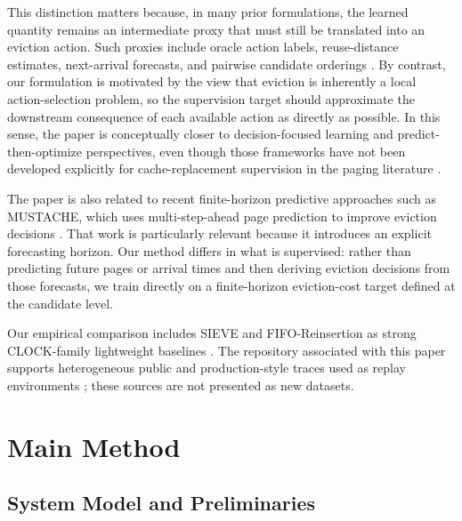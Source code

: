 \documentclass[preprint,12pt]{elsarticle}
\begin{document}
This distinction matters because, in many prior formulations, the learned quantity remains an intermediate proxy that must still be translated into an eviction action. Such proxies include oracle action labels, reuse-distance estimates, next-arrival forecasts, and pairwise candidate orderings \cite{liu2020parrot,shah2022mockingjay,hu2022raven,song2023halp}. By contrast, our formulation is motivated by the view that eviction is inherently a local action-selection problem, so the supervision target should approximate the downstream consequence of each available action as directly as possible. In this sense, the paper is conceptually closer to decision-focused learning and predict-then-optimize perspectives, even though those frameworks have not been developed explicitly for cache-replacement supervision in the paging literature \cite{elmachtoub2022smart_predict_optimize,wilder2019decision_focused_learning}.

The paper is also related to recent finite-horizon predictive approaches such as MUSTACHE, which uses multi-step-ahead page prediction to improve eviction decisions \cite{tolomei2022mustache}. That work is particularly relevant because it introduces an explicit forecasting horizon. Our method differs in what is supervised: rather than predicting future pages or arrival times and then deriving eviction decisions from those forecasts, we train directly on a finite-horizon eviction-cost target defined at the candidate level.

Our empirical comparison includes SIEVE and FIFO-Reinsertion as strong CLOCK-family lightweight baselines \cite{zhang2024sieve}. The repository associated with this paper supports heterogeneous public and production-style traces used as replay environments \cite{cho2011friendship_mobility,citibike_system_data,henning2006spec_cpu2006,wikimedia_pageviews,yang2020twitter_cache_clusters,waldspurger2015shards,cachemon_open_source_cache_dataset,cachelib_cachebench_fb_hw_eval}; these sources are not presented as new datasets.

\section{Main Method}
\label{sec:method}

\subsection{System Model and Preliminaries}
\label{subsec:system_model}
\end{document}
